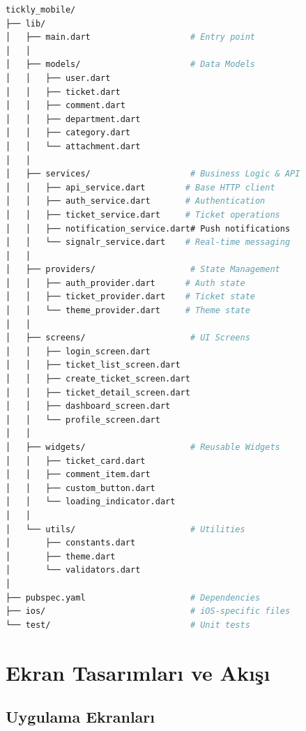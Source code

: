 \documentclass[12pt,a4paper]{article}
\begin{document}
\begin{lstlisting}[language=bash, numbers=none]
tickly_mobile/
├── lib/
│   ├── main.dart                    # Entry point
│   │
│   ├── models/                      # Data Models
│   │   ├── user.dart
│   │   ├── ticket.dart
│   │   ├── comment.dart
│   │   ├── department.dart
│   │   ├── category.dart
│   │   └── attachment.dart
│   │
│   ├── services/                    # Business Logic & API
│   │   ├── api_service.dart        # Base HTTP client
│   │   ├── auth_service.dart       # Authentication
│   │   ├── ticket_service.dart     # Ticket operations
│   │   ├── notification_service.dart# Push notifications
│   │   └── signalr_service.dart    # Real-time messaging
│   │
│   ├── providers/                   # State Management
│   │   ├── auth_provider.dart      # Auth state
│   │   ├── ticket_provider.dart    # Ticket state
│   │   └── theme_provider.dart     # Theme state
│   │
│   ├── screens/                     # UI Screens
│   │   ├── login_screen.dart
│   │   ├── ticket_list_screen.dart
│   │   ├── create_ticket_screen.dart
│   │   ├── ticket_detail_screen.dart
│   │   ├── dashboard_screen.dart
│   │   └── profile_screen.dart
│   │
│   ├── widgets/                     # Reusable Widgets
│   │   ├── ticket_card.dart
│   │   ├── comment_item.dart
│   │   ├── custom_button.dart
│   │   └── loading_indicator.dart
│   │
│   └── utils/                       # Utilities
│       ├── constants.dart
│       ├── theme.dart
│       └── validators.dart
│
├── pubspec.yaml                     # Dependencies
├── ios/                             # iOS-specific files
└── test/                            # Unit tests
\end{lstlisting}

\newpage

\section{Ekran Tasarımları ve Akışı}

\subsection{Uygulama Ekranları}
\end{document}
